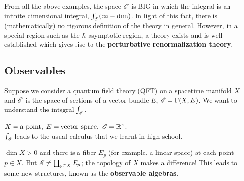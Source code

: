 \documentclass[11pt, oneside]{article}
\begin{document}
From all the above examples, the space ${\mathscr E}$ is BIG in which the integral is an infinite dimensional integral, $\int_{\mathscr E} (\infty-\text{dim})$. 
In light of this fact, there is (mathematically) no rigorous definition of the theory in general. 
However, in a special region such as the $\hbar$-asymptotic region, a theory exists and is well established which gives rise to the \textbf{perturbative renormalization theory}. 

\subsection*{Observables}
Suppose we consider a quantum field theory (QFT) on a spacetime manifold $X$ and ${\mathscr E}$ is the space of sections of a vector bundle $E$, ${\mathscr E}=\Gamma(X,E)$. We want to understand the integral $\int_{\mathscr E}$.
\bi[(1)]
\item $X=\text{a point},\ E=\text{vector space},\ \sE=\bR^n$.\\
$\int_{\mathscr E}$ leads to the usual calculus that we learnt in high school.

\item $\operatorname{dim} X>0$ and there is a fiber $E_p$ (for example, a linear space) at each point $p\in X$. But ${\mathscr E}\neq \coprod_{p\in X} E_p$; the topology of $X$ makes a difference! This leads to some new structures, known as the \textbf{observable algebras}.
\end{document}
